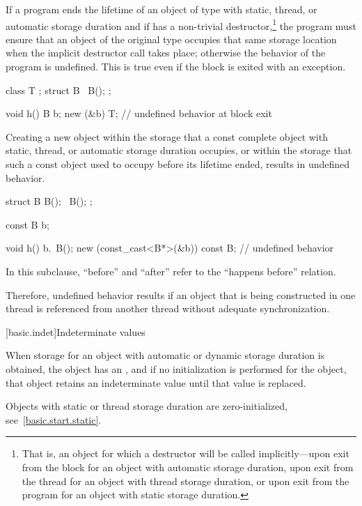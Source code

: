 \pnum
If a program ends the lifetime of an object of type  with
static, thread,
or automatic
storage duration and if  has a non-trivial destructor,\footnote{That
is, an object for which a destructor will be called
implicitly---upon exit from the block for an object with
automatic storage duration, upon exit from the thread for an object with
thread storage duration, or upon exit from the program for an object
with static storage duration.}
the program must ensure that an object of the original type occupies
that same storage location when the implicit destructor call takes
place; otherwise the behavior of the program is undefined. This is true
even if the block is exited with an exception.
\begin{example}
\begin{codeblock}
class T { };
struct B {
   ~B();
};

void h() {
   B b;
   new (&b) T;
}                               // undefined behavior at block exit
\end{codeblock}
\end{example}

\pnum
Creating a new object within the storage that a const complete
object with static, thread, or automatic storage duration occupies,
or within the storage that such a const object used to occupy before
its lifetime ended, results in undefined behavior.
\begin{example}
\begin{codeblock}
struct B {
  B();
  ~B();
};

const B b;

void h() {
  b.~B();
  new (const_cast<B*>(&b)) const B;     // undefined behavior
}
\end{codeblock}
\end{example}

\pnum
In this subclause, ``before'' and ``after'' refer to the ``happens before''
relation.
\begin{note}
Therefore, undefined behavior results
if an object that is being constructed in one thread is referenced from another
thread without adequate synchronization.
\end{note}

[basic.indet]{Indeterminate values}

\pnum
{}%
%
When storage for an object with automatic or dynamic storage duration
is obtained, the object has an , and if
no initialization is performed for the object, that object retains an
indeterminate value until that value is replaced.
\begin{note}
Objects with static or thread storage duration are zero-initialized,
see~\ref{basic.start.static}.
\end{note}

